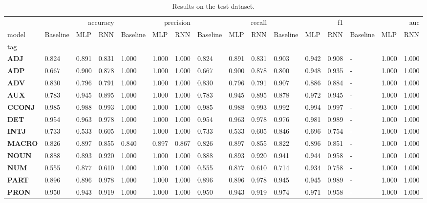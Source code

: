 \begin{table}
\caption{Results on the test dataset.}
\label{tab::ex_2_test}
\begin{tabular}{|l||l||l||l||l||l||l||l||l||l||l||l||l||l||l||l|}
\toprule
 & \multicolumn{3}{r}{accuracy} & \multicolumn{3}{r}{precision} & \multicolumn{3}{r}{recall} & \multicolumn{3}{r}{f1} & \multicolumn{3}{r}{auc} \\
model & Baseline & MLP & RNN & Baseline & MLP & RNN & Baseline & MLP & RNN & Baseline & MLP & RNN & Baseline & MLP & RNN \\
tag &  &  &  &  &  &  &  &  &  &  &  &  &  &  &  \\
\midrule
\textbf{ADJ} & 0.824 & 0.891 & 0.831 & 1.000 & 1.000 & 1.000 & 0.824 & 0.891 & 0.831 & 0.903 & 0.942 & 0.908 & - & 1.000 & 1.000 \\
\textbf{ADP} & 0.667 & 0.900 & 0.878 & 1.000 & 1.000 & 1.000 & 0.667 & 0.900 & 0.878 & 0.800 & 0.948 & 0.935 & - & 1.000 & 1.000 \\
\textbf{ADV} & 0.830 & 0.796 & 0.791 & 1.000 & 1.000 & 1.000 & 0.830 & 0.796 & 0.791 & 0.907 & 0.886 & 0.884 & - & 1.000 & 1.000 \\
\textbf{AUX} & 0.783 & 0.945 & 0.895 & 1.000 & 1.000 & 1.000 & 0.783 & 0.945 & 0.895 & 0.878 & 0.972 & 0.945 & - & 1.000 & 1.000 \\
\textbf{CCONJ} & 0.985 & 0.988 & 0.993 & 1.000 & 1.000 & 1.000 & 0.985 & 0.988 & 0.993 & 0.992 & 0.994 & 0.997 & - & 1.000 & 1.000 \\
\textbf{DET} & 0.954 & 0.963 & 0.978 & 1.000 & 1.000 & 1.000 & 0.954 & 0.963 & 0.978 & 0.976 & 0.981 & 0.989 & - & 1.000 & 1.000 \\
\textbf{INTJ} & 0.733 & 0.533 & 0.605 & 1.000 & 1.000 & 1.000 & 0.733 & 0.533 & 0.605 & 0.846 & 0.696 & 0.754 & - & 1.000 & 1.000 \\
\textbf{MACRO} & 0.826 & 0.897 & 0.855 & 0.840 & 0.897 & 0.867 & 0.826 & 0.897 & 0.855 & 0.822 & 0.896 & 0.851 & - & 1.000 & 1.000 \\
\textbf{NOUN} & 0.888 & 0.893 & 0.920 & 1.000 & 1.000 & 1.000 & 0.888 & 0.893 & 0.920 & 0.941 & 0.944 & 0.958 & - & 1.000 & 1.000 \\
\textbf{NUM} & 0.555 & 0.877 & 0.610 & 1.000 & 1.000 & 1.000 & 0.555 & 0.877 & 0.610 & 0.714 & 0.934 & 0.758 & - & 1.000 & 1.000 \\
\textbf{PART} & 0.896 & 0.896 & 0.978 & 1.000 & 1.000 & 1.000 & 0.896 & 0.896 & 0.978 & 0.945 & 0.945 & 0.989 & - & 1.000 & 1.000 \\
\textbf{PRON} & 0.950 & 0.943 & 0.919 & 1.000 & 1.000 & 1.000 & 0.950 & 0.943 & 0.919 & 0.974 & 0.971 & 0.958 & - & 1.000 & 1.000 \\

\end{tabular}
\end{table}
